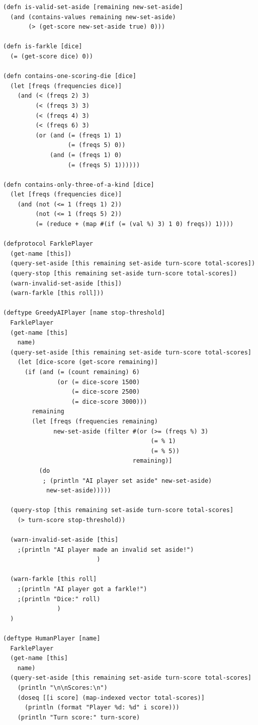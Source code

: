 \documentclass{article}
\begin{document}
\begin{verbatim}
(defn is-valid-set-aside [remaining new-set-aside]
  (and (contains-values remaining new-set-aside)
       (> (get-score new-set-aside true) 0)))

(defn is-farkle [dice]
  (= (get-score dice) 0))

(defn contains-one-scoring-die [dice]
  (let [freqs (frequencies dice)]
    (and (< (freqs 2) 3)
         (< (freqs 3) 3)
         (< (freqs 4) 3)
         (< (freqs 6) 3)
         (or (and (= (freqs 1) 1)
                  (= (freqs 5) 0))
             (and (= (freqs 1) 0)
                  (= (freqs 5) 1))))))

(defn contains-only-three-of-a-kind [dice]
  (let [freqs (frequencies dice)]
    (and (not (<= 1 (freqs 1) 2))
         (not (<= 1 (freqs 5) 2))
         (= (reduce + (map #(if (= (val %) 3) 1 0) freqs)) 1))))

(defprotocol FarklePlayer
  (get-name [this])
  (query-set-aside [this remaining set-aside turn-score total-scores])
  (query-stop [this remaining set-aside turn-score total-scores])
  (warn-invalid-set-aside [this])
  (warn-farkle [this roll]))

(deftype GreedyAIPlayer [name stop-threshold]
  FarklePlayer
  (get-name [this]
    name)
  (query-set-aside [this remaining set-aside turn-score total-scores]
    (let [dice-score (get-score remaining)]
      (if (and (= (count remaining) 6)
               (or (= dice-score 1500)
                   (= dice-score 2500)
                   (= dice-score 3000)))
        remaining
        (let [freqs (frequencies remaining)
              new-set-aside (filter #(or (>= (freqs %) 3)
                                         (= % 1)
                                         (= % 5))
                                    remaining)]
          (do
           ; (println "AI player set aside" new-set-aside)
            new-set-aside)))))

  (query-stop [this remaining set-aside turn-score total-scores]
    (> turn-score stop-threshold))
    
  (warn-invalid-set-aside [this]
    ;(println "AI player made an invalid set aside!")
                          )

  (warn-farkle [this roll]
    ;(println "AI player got a farkle!")
    ;(println "Dice:" roll)
               )
  )

(deftype HumanPlayer [name]
  FarklePlayer
  (get-name [this]
    name)
  (query-set-aside [this remaining set-aside turn-score total-scores]
    (println "\n\nScores:\n")
    (doseq [[i score] (map-indexed vector total-scores)]
      (println (format "Player %d: %d" i score)))
    (println "Turn score:" turn-score)
    

\end{verbatim}
\end{document}
